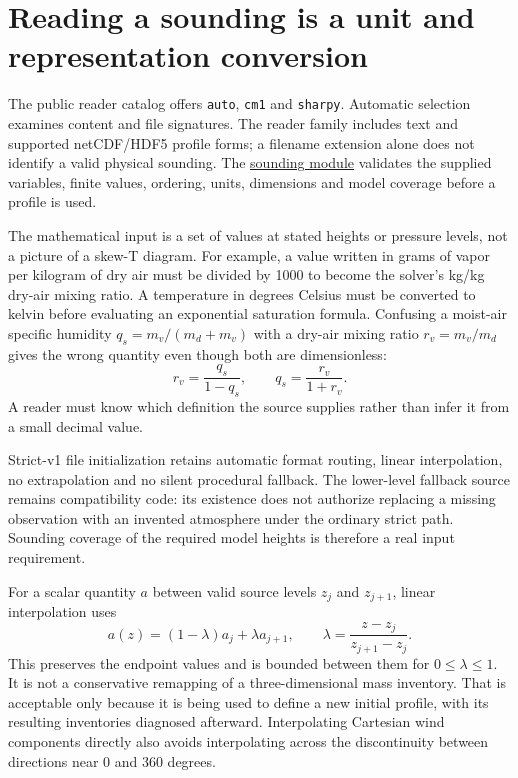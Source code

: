 \section{Reading a sounding is a unit and representation conversion}

The public reader catalog offers \texttt{auto}, \texttt{cm1} and
\texttt{sharpy}. Automatic selection examines content and file signatures.
The reader family includes text and supported netCDF/HDF5 profile forms; a
filename extension alone does not identify a valid physical sounding.
The \href{../src/soundings}{sounding module} validates the supplied variables,
finite values, ordering, units, dimensions and model coverage before a profile
is used.

The mathematical input is a set of values at stated heights or pressure levels,
not a picture of a skew-T diagram. For example, a value written in grams of
vapor per kilogram of dry air must be divided by 1000 to become the solver's
kg/kg dry-air mixing ratio. A temperature in degrees Celsius must be converted
to kelvin before evaluating an exponential saturation formula. Confusing a
moist-air specific humidity $q_s=m_v/(m_d+m_v)$ with a dry-air mixing ratio
$r_v=m_v/m_d$ gives the wrong quantity even though both are dimensionless:
\[
 r_v=\frac{q_s}{1-q_s},\qquad q_s=\frac{r_v}{1+r_v}.
\]
A reader must know which definition the source supplies rather than infer it
from a small decimal value.

Strict-v1 file initialization retains automatic format routing, linear
interpolation, no extrapolation and no silent procedural fallback. The
lower-level fallback source remains compatibility code: its existence does
not authorize replacing a missing observation with an invented atmosphere
under the ordinary strict path. Sounding coverage of the required model heights
is therefore a real input requirement.

For a scalar quantity $a$ between valid source levels $z_j$ and $z_{j+1}$,
linear interpolation uses
\[
 a(z)=(1-\lambda)a_j+\lambda a_{j+1},\qquad
 \lambda=\frac{z-z_j}{z_{j+1}-z_j}.
\]
This preserves the endpoint values and is bounded between them for
$0\le\lambda\le1$. It is not a conservative remapping of a three-dimensional
mass inventory. That is acceptable only because it is being used to define a
new initial profile, with its resulting inventories diagnosed afterward.
Interpolating Cartesian wind components directly also avoids interpolating
across the discontinuity between directions near $0$ and $360$ degrees.

